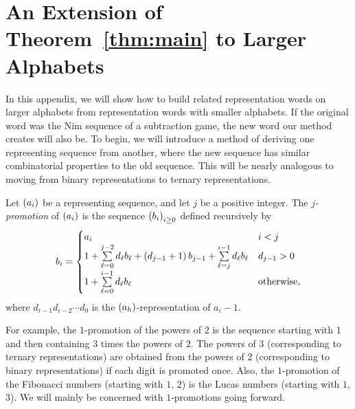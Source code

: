 \documentclass[english,12pt]{article}
\newcommand{\seq}{\p}
\begin{document}
\section{An Extension of Theorem~\ref{thm:main} to Larger Alphabets}\label{app:promo}
In this appendix, we will show how to build related representation words on larger alphabets from representation words with smaller alphabets.  If the original word was the Nim sequence of a subtraction game, the new word our method creates will also be.
To begin, we will introduce a method of deriving one representing sequence from another, where the new sequence has similar combinatorial properties to the old sequence. %
This will be nearly analogous to moving from binary representations to ternary representations.
\begin{defin}\label{def:promo}
Let $\seq{a_i}$ be a representing sequence, and let $j$ be a positive integer.
The \emph{$j$-promotion} of $\seq{a_i}$ is the sequence $\seq{b_i}_{i\geq0}$ defined recursively by
\[
b_i=
\begin{cases}
a_i & i<j\\
1+\sum\limits_{\ell=0}^{j-2}d_\ell b_\ell+\left(d_{j-1}+1\right)b_{j-1}+\sum\limits_{\ell=j}^{i-1}d_\ell b_\ell & d_{j-1}>0\\
1+\sum\limits_{\ell=0}^{i-1}d_\ell b_\ell & \text{otherwise},
\end{cases}
\]
where $d_{i-1}d_{i-2}\cdots d_0$ is the $\seq{a_h}$-representation of $a_i-1$.
\end{defin}
For example, the $1$-promotion of the powers of $2$ is the sequence starting with $1$ and then containing $3$ times the powers of $2$.  The powers of $3$ (corresponding to ternary representations) are obtained from the powers of $2$ (corresponding to binary representations) if each digit is promoted once.  Also, the $1$-promotion of the Fibonacci numbers (starting with $1$, $2$) is the Lucas numbers  (starting with $1$, $3$).  We will mainly be concerned with $1$-promotions going forward.
\end{document}
